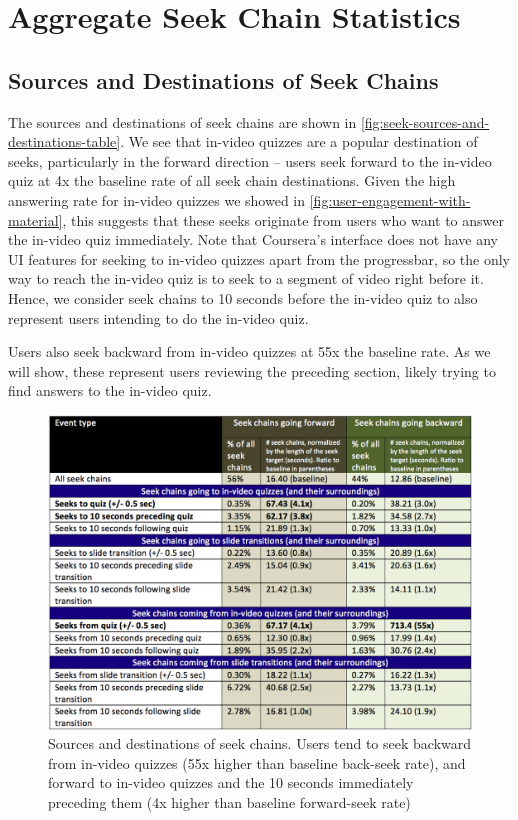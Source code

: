\documentclass{sigchi}
\begin{document}
\section{Aggregate Seek Chain Statistics}

\subsection{Sources and Destinations of Seek Chains}

The sources and destinations of seek chains are shown in \autoref{fig:seek-sources-and-destinations-table}. We see that in-video quizzes are a popular destination of seeks, particularly in the forward direction -- users seek forward to the in-video quiz at 4x the baseline rate of all seek chain destinations. Given the high answering rate for in-video quizzes we showed in \autoref{fig:user-engagement-with-material}, this suggests that these seeks originate from users who want to answer the in-video quiz immediately. Note that Coursera's interface does not have any UI features for seeking to in-video quizzes apart from the progressbar, so the only way to reach the in-video quiz is to seek to a segment of video right before it. Hence, we consider seek chains to 10 seconds before the in-video quiz to also represent users intending to do the in-video quiz.

Users also seek backward from in-video quizzes at 55x the baseline rate. As we will show, these represent users reviewing the preceding section, likely trying to find answers to the in-video quiz.

\begin{figure}
\includegraphics[width=1.0\columnwidth]{seek-sources-and-destinations-table}
\caption{Sources and destinations of seek chains. Users tend to seek backward from in-video quizzes (55x higher than baseline back-seek rate), and forward to in-video quizzes and the 10 seconds immediately preceding them (4x higher than baseline forward-seek rate)}
\label{fig:seek-sources-and-destinations-table}
\end{figure}
\end{document}
